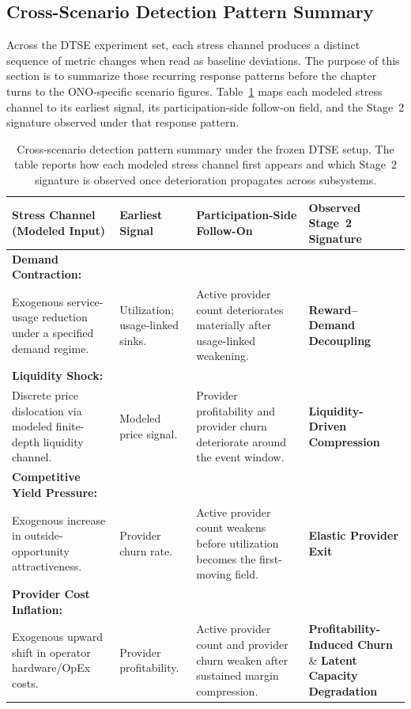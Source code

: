 \subsection{Cross-Scenario Detection Pattern Summary}
\label{subsec:mechanism_agnostic_response}
Across the DTSE experiment set, each stress channel produces a distinct sequence of metric changes when read as baseline deviations. The purpose of this section is to summarize those recurring response patterns before the chapter turns to the ONO-specific scenario figures. Table~\ref{tab:dtse_mechanism_agnostic_framework} maps each modeled stress channel to its earliest signal, its participation-side follow-on field, and the Stage~2 signature observed under that response pattern.

\begin{table}[ht]
    \centering
    \footnotesize
    \setlength{\tabcolsep}{3pt}
    \renewcommand{\arraystretch}{1.3}
    \begin{tabularx}{\textwidth}{@{}
      >{\raggedright\arraybackslash}p{}
      >{\raggedright\arraybackslash}p{}
      >{\raggedright\arraybackslash}p{}
      >{\raggedright\arraybackslash}X
    @{}}
    \toprule
    \textbf{Stress Channel (Modeled Input)} & \textbf{Earliest Signal} & \textbf{Participation-Side Follow-On} & \textbf{Observed Stage~2 Signature} \\
    \midrule
    \textbf{Demand Contraction:}\\Exogenous service-usage reduction under a specified demand regime. & Utilization; usage-linked sinks. & Active provider count deteriorates materially after usage-linked weakening. & \textbf{Reward--Demand Decoupling} \\
    \addlinespace
    \textbf{Liquidity Shock:}\\Discrete price dislocation via modeled finite-depth liquidity channel. & Modeled price signal. & Provider profitability and provider churn deteriorate around the event window. & \textbf{Liquidity-Driven Compression} \\
    \addlinespace
    \textbf{Competitive Yield Pressure:}\\Exogenous increase in outside-opportunity attractiveness. & Provider churn rate. & Active provider count weakens before utilization becomes the first-moving field. & \textbf{Elastic Provider Exit} \\
    \addlinespace
    \textbf{Provider Cost Inflation:}\\Exogenous upward shift in operator hardware/OpEx costs. & Provider profitability. & Active provider count and provider churn weaken after sustained margin compression. & \textbf{Profitability-Induced Churn} \& \textbf{Latent Capacity Degradation} \\
    \bottomrule
    \end{tabularx}
    \caption[Cross-scenario detection pattern summary]{Cross-scenario detection pattern summary under the frozen DTSE setup. The table reports how each modeled stress channel first appears and which Stage~2 signature is observed once deterioration propagates across subsystems.}
    \label{tab:dtse_mechanism_agnostic_framework}
\end{table}

